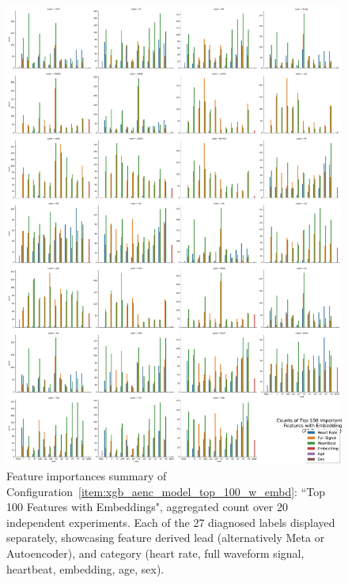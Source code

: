 \documentclass[\main/thesis.tex]{subfiles}
\begin{document}
\begin{appendices}
\begin{figure}[t]
    \centering
    \includegraphics[width=\textwidth]{figure/top_100_feature_importances_all_w_embedding.pdf}
    \caption{Feature importances summary of Configuration~\ref{item:xgb_aenc_model_top_100_w_embd}: ``Top 100 Features with Embeddings", aggregated count over 20 independent experiments. Each of the 27 diagnosed labels displayed separately, showcasing feature derived lead (alternatively Meta or Autoencoder), and category (heart rate, full waveform signal, heartbeat, embedding, age, sex).}
    \label{fig:xgb_aenc_top_100_features_labelwise_count}
\end{figure}

\end{appendices}
\end{document}
